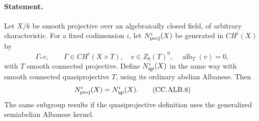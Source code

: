 \documentclass[11pt,a4paper]{article}
\theoremstyle{definition}\newtheorem{definition}[theorem]{Definition}
\theoremstyle{remark}\newtheorem{remark}[theorem]{Remark}
\begin{document}
\paragraph{Statement.}
Let $X/k$ be smooth projective over an algebraically
closed field, of arbitrary characteristic.
For a fixed codimension $i$, let
$N^i_{\rm proj}(X)$ be generated in $CH^i(X)$ by
\[
 \Gamma_*v,\qquad
 \Gamma\in CH^i(X\times T),\quad
 v\in Z_0(T)^0,\quad \operatorname{alb}_T(v)=0,
                                                               \tag{CC.ALB.7}
\]
with $T$ smooth connected projective.
Define $N^i_{\rm qp}(X)$ in the same way with smooth
connected quasiprojective $T$, using its ordinary
abelian Albanese.  Then
\[
 N^i_{\rm proj}(X)=N^i_{\rm qp}(X).                 \tag{CC.ALB.8}
\]
The same subgroup results if the quasiprojective
definition uses the generalized semiabelian
Albanese kernel.
\end{document}
